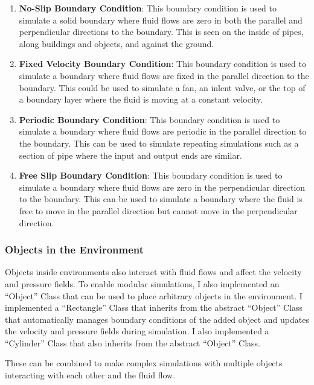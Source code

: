 \begin{enumerate}
    \item \textbf{No-Slip Boundary Condition}: This boundary condition is used to simulate a solid boundary where fluid flows are zero in both the parallel and perpendicular directions to the boundary. This is seen on the inside of pipes, along buildings and objects, and against the ground.
    \item \textbf{Fixed Velocity Boundary Condition}: This boundary condition is used to simulate a boundary where fluid flows are fixed in the parallel direction to the boundary. This could be used to simulate a fan, an inlent valve, or the top of a boundary layer where the fluid is moving at a constant velocity.
    \item \textbf{Periodic Boundary Condition}: This boundary condition is used to simulate a boundary where fluid flows are periodic in the parallel direction to the boundary. This can be used to simulate repeating simulations such as a section of pipe where the input and output ends are similar.
    \item \textbf{Free Slip Boundary Condition}: This boundary condition is used to simulate a boundary where fluid flows are zero in the perpendicular direction to the boundary. This can be used to simulate a boundary where the fluid is free to move in the parallel direction but cannot move in the perpendicular direction.
\end{enumerate}


\subsubsection{Objects in the Environment}
Objects inside environments also interact with fluid flows and affect the velocity and pressure fields.
To enable modular simulations, I also implemented an ``Object'' Class that can be used to place arbitrary objects in the environment.
I implemented a ``Rectangle'' Class that inherits from the abstract ``Object'' Class that automatically manages boundary conditions of the added object and updates the velocity and pressure fields during simulation.
I also implemented a ``Cylinder'' Class that also inherits from the abstract ``Object'' Class.

These can be combined to make complex simulations with multiple objects interacting with each other and the fluid flow.

